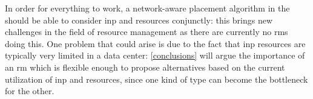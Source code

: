 In order for everything to work, a network-aware placement algorithm in the  should be able to consider \gls{inp} and  resources conjunctly: this brings new challenges in the field of resource management as there are currently no \glspl{rm} doing this.
One problem that could arise is due to the fact that \gls{inp} resources are typically very limited in a data center: \autoref{conclusions} will argue the importance of an \gls{rm} which is flexible enough to propose alternatives based on the current utilization of \gls{inp} and  resources, since one kind of  type can become the bottleneck for the other.
